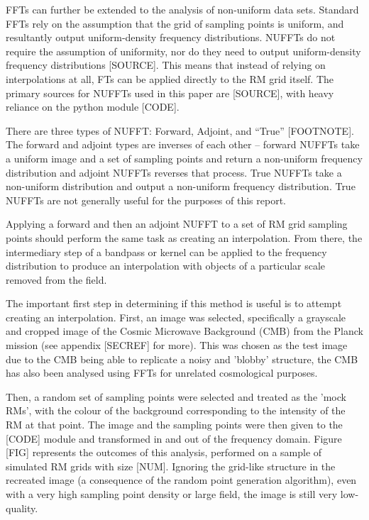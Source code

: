FFTs can further be extended to the analysis of non-uniform data sets. Standard FFTs rely on the assumption that the grid of sampling points is uniform, and resultantly output uniform-density frequency distributions. NUFFTs do not require the assumption of uniformity, nor do they need to output uniform-density frequency distributions [SOURCE]. This means that instead of relying on interpolations at all, FTs can be applied directly to the RM grid itself. The primary sources for NUFFTs used in this paper are [SOURCE], with heavy reliance on the python module [CODE].


There are three types of NUFFT: Forward, Adjoint, and “True” [FOOTNOTE]. The forward and adjoint types are inverses of each other – forward NUFFTs take a uniform image and a set of sampling points and return a non-uniform frequency distribution and adjoint NUFFTs reverses that process. True NUFFTs take a non-uniform distribution and output a non-uniform frequency distribution. True NUFFTs are not generally useful for the purposes of this report.


Applying a forward and then an adjoint NUFFT to a set of RM grid sampling points should perform the same task as creating an interpolation. From there, the intermediary step of a bandpass or kernel can be applied to the frequency distribution to produce an interpolation with objects of a particular scale removed from the field.


The important first step in determining if this method is useful is to attempt creating an interpolation. First, an image was selected, specifically a grayscale and cropped image of the Cosmic Microwave Background (CMB) from the Planck mission (see appendix [SECREF] for more). This was chosen as the test image due to the CMB being able to replicate a noisy and 'blobby' structure, the CMB has also been analysed using FFTs for unrelated cosmological purposes.


Then, a random set of sampling points were selected and treated as the 'mock RMs', with the colour of the background corresponding to the intensity of the RM at that point. The image and the sampling points were then given to the [CODE] module and transformed in and out of the frequency domain. Figure [FIG] represents the outcomes of this analysis, performed on a sample of simulated RM grids with size [NUM]. Ignoring the grid-like structure in the recreated image (a consequence of the random point generation algorithm), even with a very high sampling point density or large field, the image is still very low-quality.


